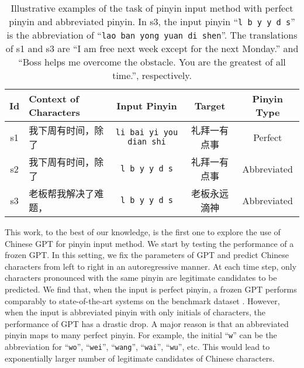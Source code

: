 
\begin{table*}[ht]
\centering
\begin{tabular}{c|l|c|c|c}
\toprule
Id&\textbf{Context of Characters} & \textbf{Input Pinyin} & \textbf{Target} & \textbf{Pinyin Type}\\
\midrule
s1&我下周有时间，除了& \texttt{li bai yi you dian shi} & {礼拜一有点事} & Perfect \\
s2&我下周有时间，除了& \texttt{l b y y d s} & {礼拜一有点事} & Abbreviated\\
s3&老板帮我解决了难题，& \texttt{l b y y d s} & {老板永远滴神} & Abbreviated\\
\bottomrule
\end{tabular}
\caption{Illustrative examples of the task of pinyin input method with perfect pinyin and abbreviated pinyin. In s3, the input pinyin ``\texttt{l b y y d s}'' is the abbreviation of ``\texttt{lao ban yong yuan di shen}''. The translations of s1 and s3 are ``I am free next week except for the next Monday.'' and ``Boss helps me overcome the obstacle. You are the greatest of all time.'', respectively. }
\label{tab:task-definition-example}
\end{table*}
This work, to the best of our knowledge, is the first one to explore the use of Chinese GPT for pinyin input method. 
We start by testing the performance of a frozen GPT.
In this setting, we fix the parameters of GPT and predict Chinese characters from left to right in an autoregressive manner. 
At each time step, only characters pronounced with the same pinyin are legitimate candidates to be predicted.
We find that, when the input is perfect pinyin, a frozen GPT performs comparably to state-of-the-art systems on the benchmark dataset \cite{yang-etal-2012-towards}.
However, when the input is abbreviated pinyin with only initials of characters, the performance of GPT has a drastic drop.
A major reason is that an abbreviated pinyin maps to many perfect pinyin. 
For example, the initial ``\texttt{w}'' can be the abbreviation for ``\texttt{wo}'', ``\texttt{wei}'', ``\texttt{wang}'', ``\texttt{wai}'', ``\texttt{wu}'',  etc. 
This would lead to exponentially larger number of legitimate candidates of Chinese characters.
